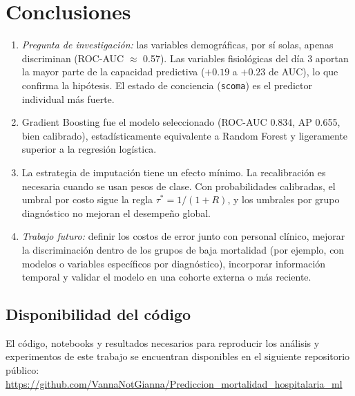 \documentclass[conference]{IEEEtran}
\begin{document}
\section{Conclusiones}
\begin{enumerate}
\item \textit{Pregunta de investigación:} las variables demográficas, por sí solas, apenas discriminan (ROC-AUC $\approx$ 0.57). Las variables fisiológicas del día 3 aportan la mayor parte de la capacidad predictiva ($+0.19$ a $+0.23$ de AUC), lo que confirma la hipótesis. El estado de conciencia (\texttt{scoma}) es el predictor individual más fuerte.
\item Gradient Boosting fue el modelo seleccionado (ROC-AUC 0.834, AP 0.655, bien calibrado), estadísticamente equivalente a Random Forest y ligeramente superior a la regresión logística.
\item La estrategia de imputación tiene un efecto mínimo. La recalibración es necesaria cuando se usan pesos de clase. Con probabilidades calibradas, el umbral por costo sigue la regla $\tau^*=1/(1+R)$, y los umbrales por grupo diagnóstico no mejoran el desempeño global.
\item \textit{Trabajo futuro:} definir los costos de error junto con personal clínico, mejorar la discriminación dentro de los grupos de baja mortalidad (por ejemplo, con modelos o variables específicos por diagnóstico), incorporar información temporal y validar el modelo en una cohorte externa o más reciente.
\end{enumerate}

\subsection*{Disponibilidad del código}
El código, notebooks y resultados necesarios para reproducir los análisis y experimentos de este trabajo se encuentran disponibles en el siguiente repositorio público:
\url{https://github.com/VannaNotGianna/Prediccion_mortalidad_hospitalaria_ml}
\end{document}
